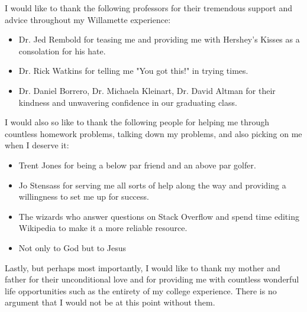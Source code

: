 I would like to thank the following professors for their tremendous support and advice throughout my Willamette experience:
\begin{itemize}
    \item Dr. Jed Rembold for teasing me and providing me with Hershey's Kisses as a consolation for his hate.
    \item Dr. Rick Watkins for telling me "You got this!" in trying times.
    \item Dr. Daniel Borrero, Dr. Michaela Kleinart, Dr. David Altman for their kindness and unwavering confidence in our graduating class.
\end{itemize}

I would also so like to thank the following people for helping me through countless homework problems, talking down my problems, and also picking on me when I deserve it:

\begin{itemize}
    \item Trent Jones for being a below par friend and an above par golfer.
    \item Jo Stensass for serving me all sorts of help along the way and providing a willingness to set me up for success.
    \item The wizards who answer questions on Stack Overflow and spend time editing Wikipedia to make it a more reliable resource.
    \item Not only to God but to Jesus
\end{itemize}

Lastly, but perhaps most importantly, I would like to thank my mother and father for their unconditional love and for providing me with countless wonderful life opportunities such as the entirety of my college experience.  There is no argument that I would not be at this point without them.